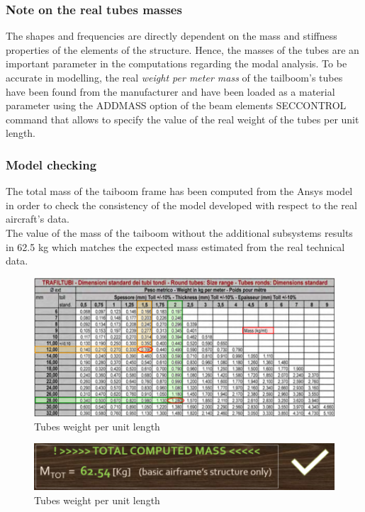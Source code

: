 \clearpage
\subsubsection*{Note on the real tubes masses}
\noindent
The shapes and frequencies are directly dependent on the mass and stiffness properties of the elements of the structure. Hence, the masses of the tubes are an important parameter in the computations regarding the modal analysis. To be accurate in modelling, the real \emph{weight per meter mass} of the tailboom's tubes have been found from the manufacturer and have been loaded as a material parameter using the ADDMASS option of the beam elements SECCONTROL command that allows to specify the value of the real weight of the tubes per unit length. 

\subsubsection*{Model checking}
\noindent
The total mass of the taiboom frame has been computed from the Ansys model in order to check the consistency of the model developed with respect to the real aircraft's data. \\
The value of the mass of the taiboom without the additional subsystems results in 62.5 kg which matches the expected mass estimated from the real technical data.
\begin{figure}[h]
	\begin{center}
		\centering  		 		
		\includegraphics[width=1\linewidth]{PICTURES/2_Lama_truss/PNG/addmass2.png}
	\end{center}
	\caption {Tubes weight per unit length}
\end{figure}




\begin{figure}[h]
	\begin{center}
		\centering  		 		
		\includegraphics[width=0.8\linewidth]{PICTURES/2_Lama_truss/PNG/tot_mass.png}
	\end{center}
	\caption {Tubes weight per unit length}
\end{figure}


